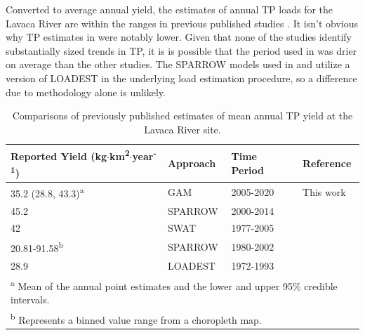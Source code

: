 \documentclass[sn-basic,referee,lineno,pdflatex]{sn-jnl}
\begin{document}
Converted to average annual yield, the estimates of annual TP loads for
the Lavaca River are within the ranges in previous published studies
\citep[Table~\ref{tab:table5},][]{dunnTrendsNutrientInflows1996, rebichSourcesDeliveryNutrients2011, omaniEstimationSedimentNutrient2014, wise_spatially_2019}.
It isn't obvious why TP estimates in
\citet{dunnTrendsNutrientInflows1996} were notably lower. Given that
none of the studies identify substantially sized trends in TP, it is is
possible that the period used in \citet{dunnTrendsNutrientInflows1996}
was drier on average than the other studies. The SPARROW models used in
\citet{rebichSourcesDeliveryNutrients2011} and
\citet{wise_spatially_2019} utilize a version of LOADEST in the
underlying load estimation procedure, so a difference due to methodology
alone is unlikely.

\begin{table}

\caption{\label{tab:table5}Comparisons of previously published estimates of mean annual TP yield at the Lavaca River site.}
\centering
\begin{tabular}[t]{llll}
\toprule
Reported Yield (kg$\cdot$km\textsuperscript{2}$\cdot$year\textsuperscript{-1}) & Approach & Time Period & Reference\\
\midrule
35.2 (28.8, 43.3)\textsuperscript{a} & GAM & 2005-2020 & This work\\
45.2 & SPARROW & 2000-2014 & \cite{wise_spatially_2019}\\
42 & SWAT & 1977-2005 & \cite{omaniEstimationSedimentNutrient2014}\\
20.81-91.58\textsuperscript{b} & SPARROW & 1980-2002 & \cite{rebichSourcesDeliveryNutrients2011}\\
28.9 & LOADEST & 1972-1993 & \cite{dunnTrendsNutrientInflows1996}\\
\bottomrule
\multicolumn{4}{l}{\rule{0pt}{1em}\textsuperscript{a} Mean of the annual point estimates and the lower and upper 95\% credible intervals.}\\
\multicolumn{4}{l}{\rule{0pt}{1em}\textsuperscript{b} Represents a binned value range from a choropleth map.}\\
\end{tabular}
\end{table}
\end{document}
